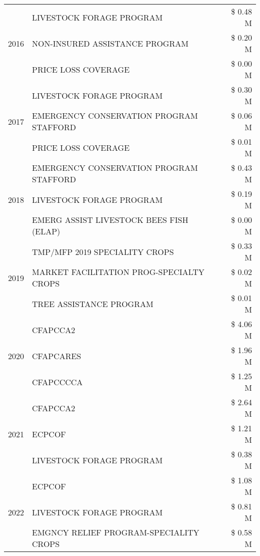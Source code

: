 \begin{tabular}{llr}
\cline{1-3}
\multirow[t]{3}{*}{2016} & LIVESTOCK FORAGE PROGRAM & \$ 0.48 M \\
 & NON-INSURED ASSISTANCE PROGRAM & \$ 0.20 M \\
 & PRICE LOSS COVERAGE & \$ 0.00 M \\
\cline{1-3}
\multirow[t]{3}{*}{2017} & LIVESTOCK FORAGE PROGRAM & \$ 0.30 M \\
 & EMERGENCY CONSERVATION PROGRAM STAFFORD & \$ 0.06 M \\
 & PRICE LOSS COVERAGE & \$ 0.01 M \\
\cline{1-3}
\multirow[t]{3}{*}{2018} & EMERGENCY CONSERVATION PROGRAM STAFFORD & \$ 0.43 M \\
 & LIVESTOCK FORAGE PROGRAM & \$ 0.19 M \\
 & EMERG ASSIST LIVESTOCK BEES FISH (ELAP) & \$ 0.00 M \\
\cline{1-3}
\multirow[t]{3}{*}{2019} & TMP/MFP 2019 SPECIALITY CROPS & \$ 0.33 M \\
 & MARKET FACILITATION PROG-SPECIALTY CROPS & \$ 0.02 M \\
 & TREE ASSISTANCE PROGRAM & \$ 0.01 M \\
\cline{1-3}
\multirow[t]{3}{*}{2020} & CFAPCCA2 & \$ 4.06 M \\
 & CFAPCARES & \$ 1.96 M \\
 & CFAPCCCCA & \$ 1.25 M \\
\cline{1-3}
\multirow[t]{3}{*}{2021} & CFAPCCA2 & \$ 2.64 M \\
 & ECPCOF & \$ 1.21 M \\
 & LIVESTOCK FORAGE PROGRAM & \$ 0.38 M \\
\cline{1-3}
\multirow[t]{3}{*}{2022} & ECPCOF & \$ 1.08 M \\
 & LIVESTOCK FORAGE PROGRAM & \$ 0.81 M \\
 & EMGNCY RELIEF PROGRAM-SPECIALITY CROPS & \$ 0.58 M \\
\cline{1-3}
\bottomrule
\end{tabular}
